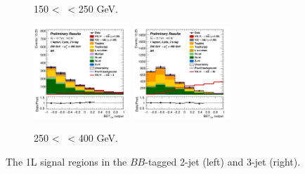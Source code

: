 \begin{figure}[h!]
\begin{subfigure}[b]{\textwidth}
        \caption{150 < \ptv\ < 250 GeV.}
        \label{fig:plots_VHbb_1L_150_SR}
    \end{subfigure}
    \begin{subfigure}[b]{\textwidth}
        \centering
        \includegraphics[width=0.40\textwidth]{Images/VH/Own_fit/postfit_VHbb/Region_distmva_BMax400_BMin250_DSR_J2_TTypebb_T2_L1_Y6051_GlobalFit_conditionnal_mu1.png}
        \includegraphics[width=0.40\textwidth]{Images/VH/Own_fit/postfit_VHbb/Region_distmva_BMax400_BMin250_DSR_J3_TTypebb_T2_L1_Y6051_GlobalFit_conditionnal_mu1.png}
        \caption{250 < \ptv\ < 400 GeV.}
        \label{fig:plots_VHbb_1L_250_SR}
    \end{subfigure}
    \caption{The 1L signal regions in the $BB$-tagged 2-jet (left) and 3-jet (right).}
    \label{fig:plots_VHbb_1L_SR}
\end{figure} 

\vspace*{\fill} \clearpage
\vspace*{\fill}


